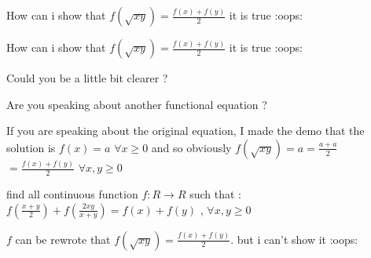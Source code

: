 \begin{solution}
	How can i show that $ f(\sqrt {xy} ) = \frac{{f(x) + f(y)}}{2}$
 it is true   :oops:
\end{solution}



\begin{solution}
	\begin{tcolorbox}How can i show that $ f(\sqrt {xy} ) = \frac {{f(x) + f(y)}}{2}$
 it is true   :oops:\end{tcolorbox}

Could you be a little bit clearer ?

Are you speaking about another functional equation ?

If you are speaking about the original equation, I made the demo that the solution is $ f(x)=a$ $ \forall x\geq 0$ and so obviously $ f(\sqrt {xy} ) = a = \frac{a+a}2$ $ =\frac {{f(x) + f(y)}}{2}$ $ \forall x,y\geq 0$
\end{solution}



\begin{solution}
	\begin{tcolorbox}find all continuous function $ f: R\to R$ such that : $ f(\frac {x + y}{2}) + f( \frac {2xy}{x + y}) = f(x) + f(y)$ , $ \forall x,y \ge 0$\end{tcolorbox} 
 $ f$ can be rewrote that $ f(\sqrt {xy} ) = \frac {{f(x) + f(y)}}{2}$. but i can't show it  :oops:
\end{solution}



